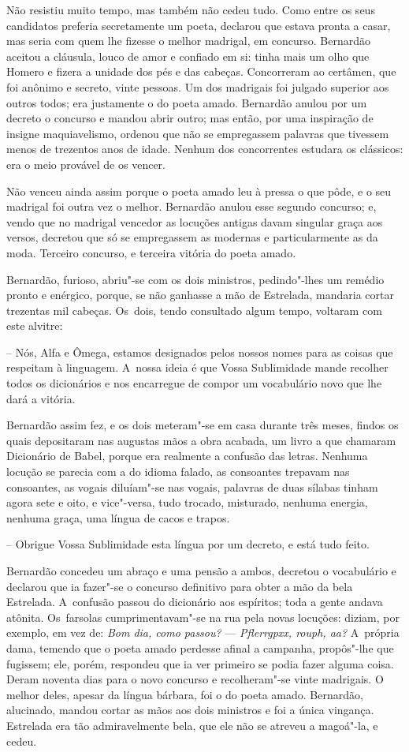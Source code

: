 Não resistiu muito tempo, mas também não cedeu tudo. Como entre os seus
candidatos preferia secretamente um poeta, declarou que estava pronta a
casar, mas seria com quem lhe fizesse o melhor madrigal, em concurso.
Bernardão aceitou a cláusula, louco de amor e confiado em si: tinha mais
um olho que Homero e fizera a unidade dos pés e das cabeças. Concorreram
ao certâmen, que foi anônimo e secreto, vinte pessoas. Um dos madrigais
foi julgado superior aos outros todos; era justamente o do poeta amado.
Bernardão anulou por um decreto o concurso e mandou abrir outro; mas
então, por uma inspiração de insigne maquiavelismo, ordenou que não se
empregassem palavras que tivessem menos de trezentos anos de idade.
Nenhum dos concorrentes estudara os clássicos: era o meio provável de os
vencer.

Não venceu ainda assim porque o poeta amado leu à pressa o que pôde, e o
seu madrigal foi outra vez o melhor. Bernardão anulou esse segundo
concurso; e, vendo que no madrigal vencedor as locuções antigas davam
singular graça aos versos, decretou que só se empregassem as modernas e
particularmente as da moda. Terceiro concurso, e terceira vitória do
poeta amado.

Bernardão, furioso, abriu"-se com os dois ministros, pedindo"-lhes um
remédio pronto e enérgico, porque, se não ganhasse a mão de Estrelada,
mandaria cortar trezentas mil cabeças. Os~dois, tendo consultado algum
tempo, voltaram com este alvitre:

-- Nós, Alfa e Ômega, estamos designados pelos nossos nomes para as
coisas que respeitam à linguagem. A~nossa ideia é que Vossa Sublimidade
mande recolher todos os dicionários e nos encarregue de compor um
vocabulário novo que lhe dará a vitória.

Bernardão assim fez, e os dois meteram"-se em casa durante três meses,
findos os quais depositaram nas augustas mãos a obra acabada, um livro a
que chamaram Dicionário de Babel, porque era realmente a confusão das
letras. Nenhuma locução se parecia com a do idioma falado, as consoantes
trepavam nas consoantes, as vogais diluíam"-se nas vogais, palavras de
duas sílabas tinham agora sete e oito, e vice"-versa, tudo trocado,
misturado, nenhuma energia, nenhuma graça, uma língua de cacos e trapos.

-- Obrigue Vossa Sublimidade esta língua por um decreto, e está tudo
feito.

Bernardão concedeu um abraço e uma pensão a ambos, decretou o
vocabulário e declarou que ia fazer"-se o concurso definitivo para obter
a mão da bela Estrelada. A~confusão passou do dicionário aos espíritos;
toda a gente andava atônita. Os~farsolas cumprimentavam"-se na rua pela
novas locuções: diziam, por exemplo, em vez de: \emph{Bom dia, como
passou?} --- \emph{Pflerrgpxx, rouph, aa?} A~própria dama, temendo que o
poeta amado perdesse afinal a campanha, propôs"-lhe que fugissem; ele,
porém, respondeu que ia ver primeiro se podia fazer alguma coisa. Deram
noventa dias para o novo concurso e recolheram"-se vinte madrigais. O
melhor deles, apesar da língua bárbara, foi o do poeta amado. Bernardão,
alucinado, mandou cortar as mãos aos dois ministros e foi a única
vingança. Estrelada era tão admiravelmente bela, que ele não se atreveu
a magoá"-la, e cedeu.

